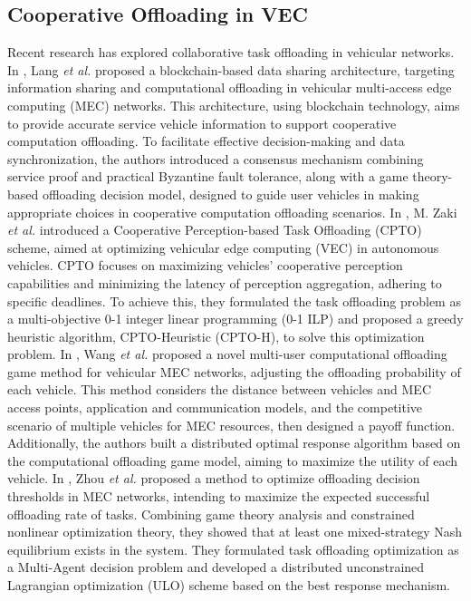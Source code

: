 \documentclass[lettersize,journal,onecolumn]{IEEEtran}
\begin{document}
\subsection{Cooperative Offloading in VEC}
Recent research has explored collaborative task offloading in vehicular networks.
In \cite{ref24}, Lang \emph{et al.}  proposed a blockchain-based data sharing architecture, targeting information sharing and computational offloading in vehicular multi-access edge computing (MEC) networks. This architecture, using blockchain technology, aims to provide accurate service vehicle information to support cooperative computation offloading. To facilitate effective decision-making and data synchronization, the authors introduced a consensus mechanism combining service proof and practical Byzantine fault tolerance, along with a game theory-based offloading decision model, designed to guide user vehicles in making appropriate choices in cooperative computation offloading scenarios. 
In \cite{ref26}, M. Zaki \emph{et al.}  introduced a Cooperative Perception-based Task Offloading (CPTO) scheme, aimed at optimizing vehicular edge computing (VEC) in autonomous vehicles. CPTO focuses on maximizing vehicles' cooperative perception capabilities and minimizing the latency of perception aggregation, adhering to specific deadlines. To achieve this, they formulated the task offloading problem as a multi-objective 0-1 integer linear programming (0-1 ILP) and proposed a greedy heuristic algorithm, CPTO-Heuristic (CPTO-H), to solve this optimization problem. 
In \cite{ref27}, Wang \emph{et al.}  proposed a novel multi-user computational offloading game method for vehicular MEC networks, adjusting the offloading probability of each vehicle. This method considers the distance between vehicles and MEC access points, application and communication models, and the competitive scenario of multiple vehicles for MEC resources, then designed a payoff function. Additionally, the authors built a distributed optimal response algorithm based on the computational offloading game model, aiming to maximize the utility of each vehicle. 
In \cite{ref28}, Zhou \emph{et al.}  proposed a method to optimize offloading decision thresholds in MEC networks, intending to maximize the expected successful offloading rate of tasks. Combining game theory analysis and constrained nonlinear optimization theory, they showed that at least one mixed-strategy Nash equilibrium exists in the system. They formulated task offloading optimization as a Multi-Agent decision problem and developed a distributed unconstrained Lagrangian optimization (ULO) scheme based on the best response mechanism. 
\end{document}
